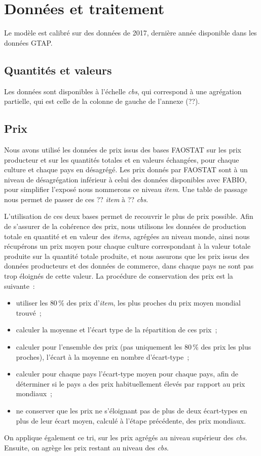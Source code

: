 \section{Données et traitement}

Le modèle est calibré sur des données de 2017, dernière année disponible dans les données GTAP.


\subsection{Quantités et valeurs}
Les données sont disponibles à l'échelle \textit{cbs}, qui correspond à une agrégation partielle, qui est celle de la colonne de gauche de l'annexe (??).

\subsection{Prix}
Nous avons utilisé les données de prix issus des bases FAOSTAT sur les prix producteur et sur les quantités totales et en valeurs échangées, pour chaque culture et chaque pays en désagrégé. Les prix donnés par FAOSTAT sont à un niveau de désagrégation inférieur à celui des données disponibles avec FABIO, pour simplifier l'exposé nous nommerons ce niveau \textit{item}. Une table de passage nous permet de passer de ces ?? \textit{item} à ?? \textit{cbs}.

L'utilisation de ces deux bases permet de recouvrir le plus de prix possible. Afin de s'assurer de la cohérence des prix, nous utilisons les données de production totale en quantité et en valeur des \textit{items}, agrégées au niveau monde, ainsi nous récupérons un prix moyen pour chaque culture correspondant à la valeur totale produite sur la quantité totale produite, et nous assurons que les prix issus des données producteurs et des données de commerce, dans chaque pays ne sont pas trop éloignés de cette valeur. La procédure de conservation des prix est la suivante~:
\begin{itemize}
    \item utiliser les {80\,\%} des prix d'\textit{item}, les plus proches du prix moyen mondial trouvé~;
    \item calculer la moyenne et l'écart type de la répartition de ces prix~;
    \item calculer pour l'ensemble des prix (pas uniquement les 80\,\% des prix les plus proches), l'écart à la moyenne en nombre d’écart-type~;
    \item calculer pour chaque pays l'écart-type moyen pour chaque pays, afin de déterminer si le pays a des prix habituellement élevés par rapport au prix mondiaux~;
    \item ne conserver que les prix ne s'éloignant pas de plus de deux écart-types en plus de leur écart moyen, calculé à l'étape précédente, des prix mondiaux.
\end{itemize}
On applique également ce tri, sur les prix agrégés au niveau supérieur des \textit{cbs}. Ensuite, on agrège les prix restant au niveau des \textit{cbs}.

